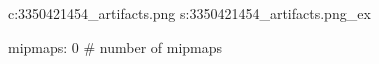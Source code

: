 c:3350421454\textures\hexer_artifacts.png
s:3350421454\textures\hexer_artifacts.png_ex

mipmaps: 0  # number of mipmaps
